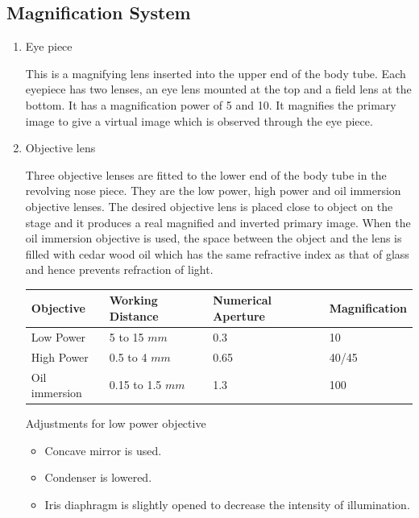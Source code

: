 \documentclass[a4paper,12pt,openany,twoside]{book}
\begin{document}
		\subsection*{Magnification System}
		\begin{enumerate}

			\item{Eye piece
				\par This is a magnifying lens inserted into the upper end of the body tube. Each eyepiece has two lenses, an eye lens mounted at the top and a field lens at the bottom. It has a magnification power of 5 and 10. It magnifies the primary image to give a virtual image which is observed through the eye piece.}
			\item{Objective lens

				\par Three objective lenses are fitted to the lower end of the body tube in the revolving nose piece. They are the low power, high power and oil immersion objective lenses. The desired objective lens is placed close to object on the stage and it produces a real magnified and inverted primary image. When the oil immersion objective is used, the space between the object and the lens is filled with cedar wood oil which has the same refractive index as that of glass and hence prevents refraction of light.\newline
				\small{%
					\begin{tabular}{|p{1in} | p{1in} |p{1in} |p{1in} |}
					\hline
					\textbf{Objective} & \textbf{Working Distance} & \textbf{Numerical Aperture} &\textbf{Magnification}\\
					\hline
					Low Power & 5 to 15 $mm$ & 0.3 & 10\\
					\hline
					High Power
					&0.5 to 4 $mm$
					&0.65
					&40/45 \\
					\hline

					Oil immersion
					&0.15 to 1.5 $mm$
					&1.3
					&100 \\

					\hline





				\end{tabular}
				}

				\par
				Adjustments for low power objective
				\begin{itemize}
					\item {Concave mirror is used.}
					\item {Condenser is lowered.}
					\item {Iris diaphragm is slightly opened to decrease the intensity of illumination.}
				\end{itemize}

}
\end{enumerate}
\end{document}
